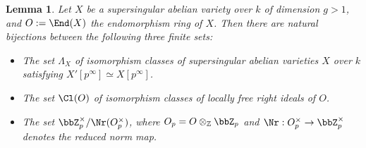 \documentclass[]{amsart}
\theoremstyle{plain}
\newtheorem{lemma}[thm]{Lemma}
\theoremstyle{definition}
\theoremstyle{remark}
\def\Zp{{\bbZ}_p}
\newcommand{\Z}{\mathbb Z}
\newcommand{\<}{\langle}   %
\renewcommand{\>}{\rangle} %
\begin{document}
\begin{lemma}\label{lm:15}
  Let $X$ be a 
  supersingular abelian variety over $k$ of dimension $g>1$, and $O:=\End(X)$ the endomorphism ring of $X$. Then there are natural 
  bijections between the following three finite sets:
  \begin{itemize}
  \item[(a)]  The set $\Lambda_X$ of isomorphism classes of supersingular abelian 
  varieties $X$ over $k$ satisfying $X'[p^\infty]\simeq X[p^\infty]$.

  \item[(b)] The set $\Cl(O)$ of isomorphism classes of locally free right ideals of $O$. 
  
  \item[(c)] The set $\Zp^\times/\Nr(O_p^\times)$, where $O_p=O\otimes_{\Z} \Zp$ and $\Nr: O_p^\times \to \Zp^\times$ denotes the reduced norm map.  
  \end{itemize}
\end{lemma}
\end{document}
